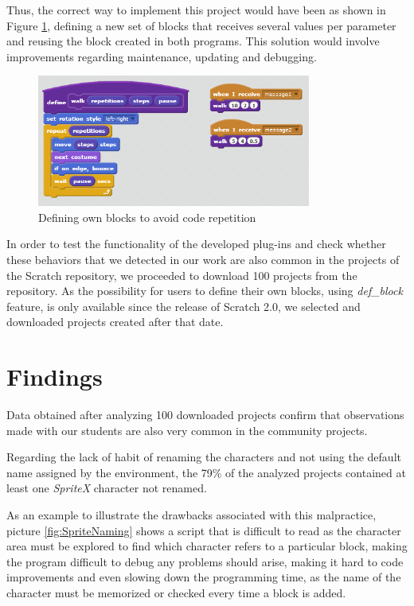 \documentclass[conference]{format/IEEEtran}
\begin{document}
Thus, the correct way to implement this project would have been as shown in Figure \ref{fig:CodeRepetition2}, defining a new set of blocks that receives several values per parameter and reusing the block created in both programs. This solution would involve improvements regarding maintenance, updating and debugging.

\begin{figure}
  \centering
    \includegraphics[width=9cm]{img/CodeRepetition2.png}
  \caption{Defining own blocks to avoid code repetition}
  \label{fig:CodeRepetition2}
\end{figure}


In order to test the functionality of the developed plug-ins and check whether these behaviors that we detected in our work are also common in the projects of the Scratch repository, we proceeded to download 100 projects from the repository. As the possibility for users to define their own blocks, using \textit{def\_block} feature, is only available since the release of Scratch 2.0, we selected and downloaded projects created after that date.


\section{Findings}
\label{sec:findings}

Data obtained after analyzing 100 downloaded projects confirm that observations made with our students are also very common in the community projects.

Regarding the lack of habit of renaming the characters and not using the default name assigned by the environment, the 79\% of the analyzed projects contained at least one \textit{SpriteX} character not renamed.

As an example to illustrate the drawbacks associated with this malpractice, picture \ref{fig:SpriteNaming} shows a script that is difficult to read as the character area must be explored to find which character refers to a particular block, making the program difficult to debug any problems should arise, making it hard to code improvements and even slowing down the programming time, as the name of the character must be memorized or checked every time a block is added. 
\end{document}

